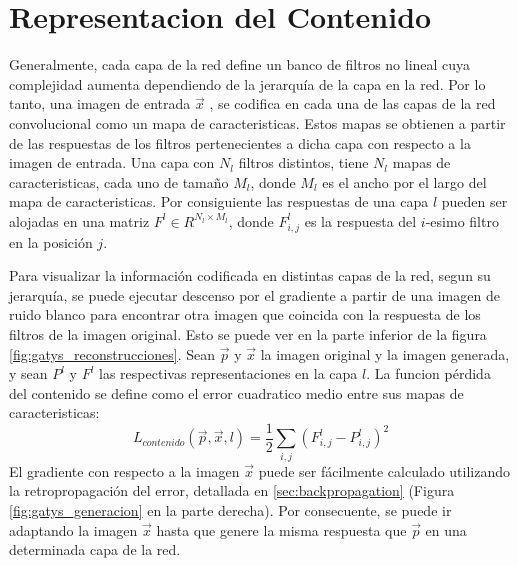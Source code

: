 \documentclass[a4paper,11pt,spanish]{book}
\begin{document}
    \section{Representacion del Contenido} \label{sec:contenido}
      Generalmente, cada capa de la red define un banco de filtros no lineal cuya complejidad aumenta dependiendo de la jerarquía de la capa en la red.
      Por lo tanto, una imagen de entrada $\overrightarrow{x}$ , se codifica en cada una de las capas de la red convolucional como un mapa de caracteristicas.
      Estos mapas se obtienen a partir de las respuestas de los filtros pertenecientes a dicha capa con respecto a la imagen de entrada.
      Una capa con $N_l$ filtros distintos, tiene $N_l$ mapas de caracteristicas, cada uno de tamaño $M_l$, donde $M_l$ es el ancho por el largo del mapa de caracteristicas.
      Por consiguiente las respuestas de una capa $l$ pueden ser alojadas en una matriz $F^l \in R^{N_l \times M_l}$, donde $F_{i,j}^l$ es la respuesta del $i$-esimo filtro en la posición $j$.
      
      Para visualizar la información codificada en distintas capas de la red, segun su jerarquía, se puede ejecutar descenso por el gradiente a partir de una imagen de ruido blanco
      para encontrar otra imagen que coincida con la respuesta de los filtros de la imagen original. Esto se puede ver en la 
      parte inferior de la figura \ref{fig:gatys_reconstrucciones}.
      Sean $\overrightarrow{p}$ y $\overrightarrow{x}$ la imagen original y la imagen generada, y sean $P^l$ y $F^l$ las respectivas representaciones en la capa $l$.
      La funcion pérdida del contenido se define como el error cuadratico medio entre sus mapas de caracteristicas:
      \begin{equation} \label{eq:perdida_contenido}
       L_{contenido}(\overrightarrow{p},\overrightarrow{x}, l) = \frac{1}{2} \sum_{i,j} (F_{i,j}^l - P_{i,j}^l)^2
      \end{equation}
      El gradiente con respecto a la imagen $\overrightarrow{x}$ puede ser fácilmente calculado utilizando la retropropagación del error, detallada en \ref{sec:backpropagation} (Figura \ref{fig:gatys_generacion} en la parte derecha).
      Por consecuente, se puede ir adaptando la imagen $\overrightarrow{x}$ hasta que genere la misma respuesta que $\overrightarrow{p}$ en una determinada capa de la red.

      
\end{document}
